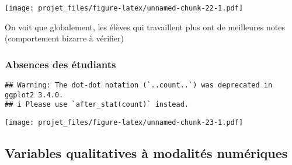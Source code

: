\documentclass[
]{article}
\newenvironment{Shaded}{\begin{snugshade}}{\end{snugshade}}
\newcommand{\AttributeTok}[1]{\textcolor[rgb]{0.77,0.63,0.00}{#1}}
\newcommand{\DecValTok}[1]{\textcolor[rgb]{0.00,0.00,0.81}{#1}}
\newcommand{\FunctionTok}[1]{\textcolor[rgb]{0.00,0.00,0.00}{#1}}
\newcommand{\NormalTok}[1]{#1}
\newcommand{\SpecialCharTok}[1]{\textcolor[rgb]{0.00,0.00,0.00}{#1}}
\newcommand{\StringTok}[1]{\textcolor[rgb]{0.31,0.60,0.02}{#1}}
\begin{document}
\texttt{[image: projet\_files/figure-latex/unnamed-chunk-22-1.pdf]}

On voit que globalement, les élèves qui travaillent plus ont de
meilleures notes (comportement bizarre à vérifier)

\hypertarget{absences-des-uxe9tudiants}{%
\subsubsection{Absences des étudiants}\label{absences-des-uxe9tudiants}}

\begin{Shaded}
\end{Shaded}

\begin{verbatim}
## Warning: The dot-dot notation (`..count..`) was deprecated in ggplot2 3.4.0.
## i Please use `after_stat(count)` instead.
\end{verbatim}

\texttt{[image: projet\_files/figure-latex/unnamed-chunk-23-1.pdf]}

\hypertarget{variables-qualitatives-uxe0-modalituxe9s-numuxe9riques}{%
\subsection{Variables qualitatives à modalités
numériques}\label{variables-qualitatives-uxe0-modalituxe9s-numuxe9riques}}
\end{document}
